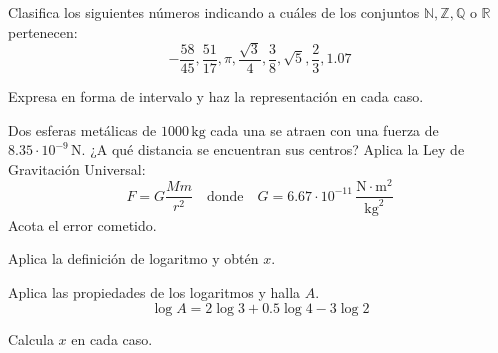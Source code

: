 \documentclass[12pt]{exam}
\begin{document}
\begin{questions}

\question Clasifica los siguientes números indicando a cuáles de los conjuntos \( \mathbb{N}, \mathbb{Z}, \mathbb{Q} \) o \( \mathbb{R} \) pertenecen:
\[
-\frac{58}{45}, \frac{51}{17}, \pi, \frac{\sqrt{3}}{4}, \frac{3}{8}, \sqrt{5}, \frac{2}{3}, 1.07
\]

\question Expresa en forma de intervalo y haz la representación en cada caso.

\question Dos esferas metálicas de \( 1000 \, \text{kg} \) cada una se atraen con una fuerza de \( 8.35 \cdot 10^{-9} \, \text{N} \). ¿A qué distancia se encuentran sus centros? Aplica la Ley de Gravitación Universal:
\[
F = G \frac{M m}{r^2} \quad \text{donde} \quad G = 6.67 \cdot 10^{-11} \, \frac{\text{N} \cdot \text{m}^2}{\text{kg}^2}
\]
Acota el error cometido.

\question Aplica la definición de logaritmo y obtén \( x \).

\question Aplica las propiedades de los logaritmos y halla \( A \).
\[
\log A = 2 \log 3 + 0.5 \log 4 - 3 \log 2
\]

\question Calcula \( x \) en cada caso.
\end{questions}
\end{document}
